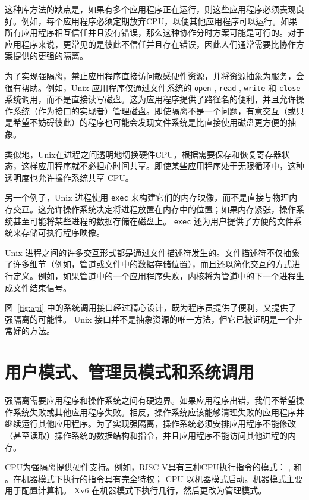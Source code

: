 这种库方法的缺点是，如果有多个应用程序正在运行，则这些应用程序必须表现良好。例如，每个应用程序必须定期放弃CPU，以便其他应用程序可以运行。如果所有应用程序相互信任并且没有错误，那么这种协作分时方案可能是可行的。对于应用程序来说，更常见的是彼此不信任并且存在错误，因此人们通常需要比协作方案提供的更强的隔离。  

为了实现强隔离，禁止应用程序直接访问敏感硬件资源，并将资源抽象为服务，会很有帮助。例如，Unix 应用程序仅通过文件系统的
    \lstinline{open}    ,
    \lstinline{read}    ,
    \lstinline{write}    和
    \lstinline{close}   系统调用，而不是直接读写磁盘。这为应用程序提供了路径名的便利，并且允许操作系统（作为接口的实现者）管理磁盘。即使隔离不是一个问题，有意交互（或只是希望不妨碍彼此）的程序也可能会发现文件系统是比直接使用磁盘更方便的抽象。  

类似地，Unix在进程之间透明地切换硬件CPU，根据需要保存和恢复寄存器状态，这样应用程序就不必担心时间共享。即使某些应用程序处于无限循环中，这种透明度也允许操作系统共享 CPU。  

另一个例子，Unix 进程使用
    \lstinline{exec}    来构建它们的内存映像，而不是直接与物理内存交互。这允许操作系统决定将进程放置在内存中的位置；如果内存紧张，操作系统甚至可能将某些进程的数据存储在磁盘上。
    \lstinline{exec}   还为用户提供了方便的文件系统来存储可执行程序映像。  

Unix 进程之间的许多交互形式都是通过文件描述符发生的。文件描述符不仅抽象了许多细节（例如，管道或文件中的数据存储位置），而且还以简化交互的方式进行定义。例如，如果管道中的一个应用程序失败，内核将为管道中的下一个进程生成文件结束信号。  

图~\ref{fig:api}   中的系统调用接口经过精心设计，既为程序员提供了便利，又提供了强隔离的可能性。 Unix 接口并不是抽象资源的唯一方法，但它已被证明是一个非常好的方法。
    \section{用户模式、管理员模式和系统调用  }     

强隔离需要应用程序和操作系统之间有硬边界。如果应用程序出错，我们不希望操作系统失败或其他应用程序失败。相反，操作系统应该能够清理失败的应用程序并继续运行其他应用程序。为了实现强隔离，操作系统必须安排应用程序不能修改（甚至读取）操作系统的数据结构和指令，并且应用程序不能访问其他进程的内存。  

CPU为强隔离提供硬件支持。例如，RISC-V具有三种CPU执行指令的模式：
        ,
        和
        。在机器模式下执行的指令具有完全特权； CPU 以机器模式启动。机器模式主要用于配置计算机。 Xv6 在机器模式下执行几行，然后更改为管理模式。  

